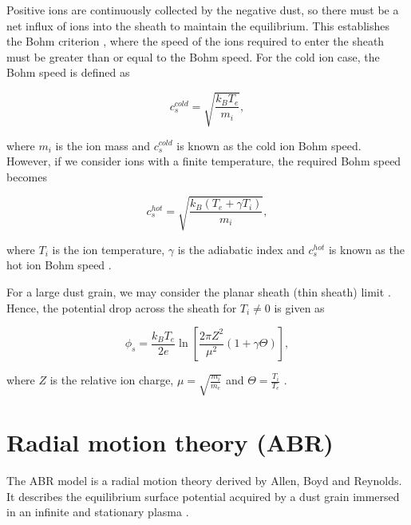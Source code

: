 \documentclass{article}
\begin{document}
\medskip

Positive ions are continuously collected by the negative dust, so there must be
a net influx of ions into the sheath to maintain the equilibrium. This establishes the Bohm
criterion \cite{Bohm}, where the speed of the ions required to enter the sheath must be 
greater than or equal to the Bohm speed. For the cold ion case, the Bohm speed is defined as

\smallskip 

\begin{equation}\label{eq:ColdBohm}
c_{s}^{cold} = \sqrt{\frac{k_{B}T_{e}}{m_{i}}},
\end{equation}

\noindent where $m_i$ is the ion mass and $c_{s}^{cold}$ is known as the cold ion Bohm speed. 
However, if we consider ions with a finite temperature, the required Bohm speed becomes 

\begin{equation}\label{eq:HotBohm}
c_{s}^{hot} = \sqrt{\frac{k_{B}(T_{e} + \gamma T_{i})}{m_{i}}},
\end{equation}

\smallskip

\noindent where $T_i$ is the ion temperature, $\gamma$ is the adiabatic index
and $c_{s}^{hot}$ is known as the hot ion Bohm speed \cite{Stangeby1986} \cite{Willis} .

\medskip

For a large dust grain, we may consider the planar sheath (thin sheath) limit \cite{Willis}. 
Hence, the potential drop across the sheath for $T_i \neq 0$ is given as

\begin{equation}\label{eq:SheathDrop}
\phi_s = \frac{k_B T_e}{2e}\ln{\left[\frac{2\pi Z^2}{\mu^2}(1 + \gamma \Theta)\right]},
\end{equation}

\noindent where $Z$ is the relative ion charge, $\mu = \sqrt{\frac{m_i}{m_e}}$ and $\Theta = \frac{T_i}{T_e}$ \cite{Stangeby1986}.

\section{Radial motion theory (ABR)}

\smallskip

The ABR model is a radial motion theory derived by Allen, Boyd and Reynolds. It describes the equilibrium surface potential acquired
by a dust grain immersed in an infinite and stationary plasma \cite{ABR}.
\end{document}

